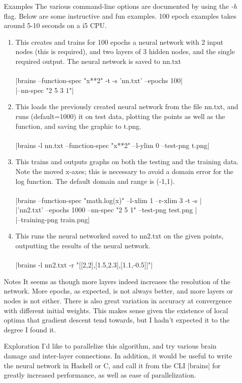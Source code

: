 \documentclass[12pt]{article}
\begin{document}
\begin{enumerate}
\item[Examples] 
The various command-line options are documented by using the \emph{-h} flag. Below are some instructive and fun examples. 100 epoch examples takes around 5-10 seconds on a i5 CPU.
	\begin{enumerate}
		\item
			This creates and trains for 100 epochs a neural network with 2 input nodes (this is required), and two layers of 3 hidden nodes, and the single required output. The neural network is saved to nn.txt\\ \\
			|brains --function-spec "x**2" -t -s 'nn.txt' --epochs 100| \\ 
				|--nn-spec "2 5 3 1"|
		\item
			This loads the previously created neural network from the file nn.txt, and runs (default=1000) it on test data, plotting the points as well as the function, and saving the graphic to t.png. \\ \\
			|brains -l nn.txt --function-spec "x**2" --l-ylim 0 --test-png t.png|
		\item
			This trains and outputs graphs on both the testing and the training data. Note the moved x-axes; this is necessary to avoid a domain error for the log function. The default domain and range is (-1,1).\\ \\
			|brains --function-spec "math.log(x)" --l-xlim 1 --r-xlim 3 -t -s | \\ 
			|'nn2.txt' --epochs 1000 --nn-spec "2 5 1" --test-png test.png |\\ 
			|--training-png train.png|
		\item
			This runs the neural networked saved to nn2.txt on the given points, outputting the results of the neural network. \\ \\
			|brains -l nn2.txt -r "[[2,2],[1.5,2.3],[1.1,-0.5]]"|
	\end{enumerate}

\item[Notes]
It seems as though more layers indeed increases the resolution of the network. More epochs, as expected, is not always better, and more layers or nodes is not either. There is also great variation in accuracy at convergence with different initial weights. This makes sense given the existence of local optima that gradient descent tend towards, but I hadn't expected it to the degree I found it.

\item[Exploration]
I'd like to parallelize this algorithm, and try various brain damage and inter-layer connections. In addition, it would be useful to write the neural network in Haskell or C, and call it from the CLI |brains| for greatly increased performance, as well as ease of parallelization. 

\end{enumerate}
\end{document}

